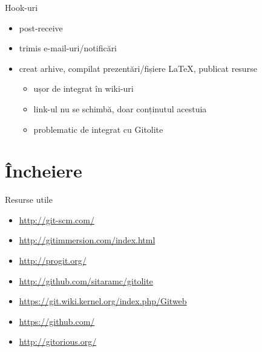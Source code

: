 \documentclass{beamer}
\begin{document}
\begin{frame}{Hook-uri}
	\begin{itemize}
		\item post-receive
		\item trimis e-mail-uri/notificări
		\item creat arhive, compilat prezentări/fișiere LaTeX, publicat
		resurse
			\begin{itemize}
				\item ușor de integrat în wiki-uri
				\item link-ul nu se schimbă, doar conținutul acestuia
                \item problematic de integrat cu Gitolite
			\end{itemize}
	\end{itemize}
\end{frame}

\section{Încheiere}

\begin{frame}{Resurse utile}
	\begin{itemize}
		\item \url{http://git-scm.com/}
        \item \url{http://gitimmersion.com/index.html}
		\item \url{http://progit.org/}
		\item \url{http://github.com/sitaramc/gitolite}
		\item \url{https://git.wiki.kernel.org/index.php/Gitweb}
        \item \url{https://github.com/}
        \item \url{http://gitorious.org/}
	\end{itemize}
\end{frame}
\end{document}
